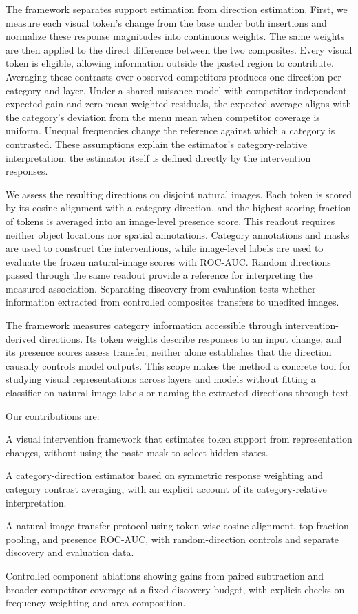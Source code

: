 The framework separates support estimation from direction estimation.
First, we measure each visual token's change from the base under both
insertions and normalize these response magnitudes into continuous weights.
The same weights are then applied to the direct difference between the two
composites. Every visual token is eligible, allowing information outside
the pasted region to contribute. Averaging these contrasts over observed competitors produces one
direction per category and layer.
Under a shared-nuisance model with competitor-independent expected gain
and zero-mean weighted residuals, the expected average aligns with the
category's deviation from the menu mean when competitor coverage is
uniform. Unequal frequencies change the reference against which a
category is contrasted. These assumptions explain the
estimator's category-relative interpretation; the estimator itself is
defined directly by the intervention responses.

We assess the resulting directions on disjoint natural images. Each token
is scored by its cosine alignment with a category direction, and the
highest-scoring fraction of tokens is averaged into an image-level presence
score. This readout requires neither object locations nor spatial
annotations. Category annotations and masks are used to construct the
interventions, while image-level labels are used to evaluate the frozen
natural-image scores with ROC-AUC. Random directions passed through the
same readout provide a reference for interpreting the measured association.
Separating discovery from evaluation tests whether information extracted
from controlled composites transfers to unedited images.

The framework measures category information accessible through
intervention-derived directions. Its token weights describe responses to
an input change, and its presence scores assess transfer; neither alone
establishes that the direction causally controls model outputs. This scope
makes the method a concrete tool for studying visual representations across
layers and models without fitting a classifier on natural-image labels or
naming the extracted directions through text.

Our contributions are:
\begin{mitemize}
\item A visual intervention framework that estimates token support from
    representation changes, without using the paste mask to select hidden
    states.
\item A category-direction estimator based on symmetric response weighting
    and category contrast averaging, with an explicit account of its
    category-relative interpretation.
\item A natural-image transfer protocol using token-wise cosine alignment,
    top-fraction pooling, and presence ROC-AUC, with random-direction
    controls and separate discovery and evaluation data.
\item Controlled component ablations showing gains from paired subtraction
    and broader competitor coverage at a fixed discovery budget, with
    explicit checks on frequency weighting and area composition.
\end{mitemize}
